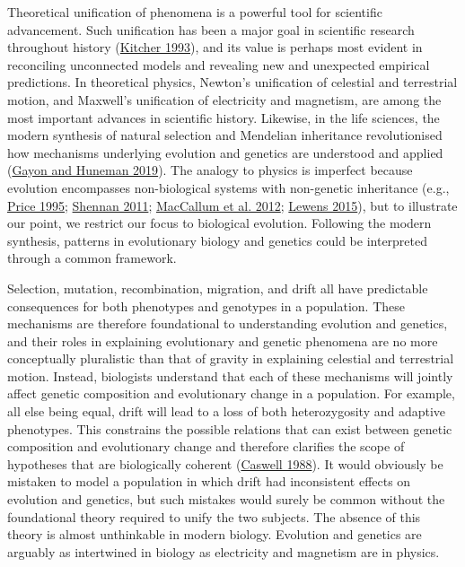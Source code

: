 \documentclass[
]{article}
\begin{document}
Theoretical unification of phenomena is a powerful tool for scientific
advancement. Such unification has been a major goal in scientific
research throughout history (\protect\hyperlink{ref-Kitcher1993}{Kitcher
1993}), and its value is perhaps most evident in reconciling unconnected
models and revealing new and unexpected empirical predictions. In
theoretical physics, Newton's unification of celestial and terrestrial
motion, and Maxwell's unification of electricity and magnetism, are
among the most important advances in scientific history. Likewise, in
the life sciences, the modern synthesis of natural selection and
Mendelian inheritance revolutionised how mechanisms underlying evolution
and genetics are understood and applied
(\protect\hyperlink{ref-Gayon2019}{Gayon and Huneman 2019}). The analogy
to physics is imperfect because evolution encompasses non-biological
systems with non-genetic inheritance (e.g.,
\protect\hyperlink{ref-Price1995}{Price 1995};
\protect\hyperlink{ref-Shennan2011}{Shennan 2011};
\protect\hyperlink{ref-MacCallum2012}{MacCallum et al. 2012};
\protect\hyperlink{ref-Lewens2015}{Lewens 2015}), but to illustrate our
point, we restrict our focus to biological evolution. Following the
modern synthesis, patterns in evolutionary biology and genetics could be
interpreted through a common framework.

Selection, mutation, recombination, migration, and drift all have
predictable consequences for both phenotypes and genotypes in a
population. These mechanisms are therefore foundational to understanding
evolution and genetics, and their roles in explaining evolutionary and
genetic phenomena are no more conceptually pluralistic than that of
gravity in explaining celestial and terrestrial motion. Instead,
biologists understand that each of these mechanisms will jointly affect
genetic composition and evolutionary change in a population. For
example, all else being equal, drift will lead to a loss of both
heterozygosity and adaptive phenotypes. This constrains the possible
relations that can exist between genetic composition and evolutionary
change and therefore clarifies the scope of hypotheses that are
biologically coherent (\protect\hyperlink{ref-Caswell1988}{Caswell
1988}). It would obviously be mistaken to model a population in which
drift had inconsistent effects on evolution and genetics, but such
mistakes would surely be common without the foundational theory required
to unify the two subjects. The absence of this theory is almost
unthinkable in modern biology. Evolution and genetics are arguably as
intertwined in biology as electricity and magnetism are in physics.
\end{document}
